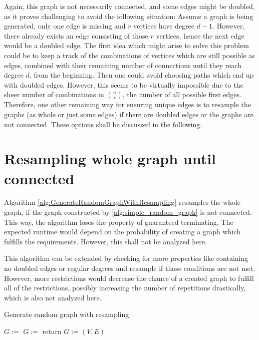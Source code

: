 Again, this graph is not necessarily connected, and some edges might be doubled, as it proves challenging to avoid the following situation: Assume a graph is being generated, only one edge is missing and $r$ vertices have degree $d-1$. However, there already exists an edge consisting of those $r$ vertices, hence the next edge would be a doubled edge. The first idea which might arise to solve this problem could be to keep a track of the combinations of vertices which are still possible as edges, combined with their remaining number of connections until they reach degree $d$, from the beginning. Then one could avoid choosing paths which end up with doubled edges. However, this seems to be virtually impossible due to the sheer number of combinations in $n\choose r$, the number of all possible first edges. Therefore, one other remaining way for ensuring unique edges is to resample the graphs (as whole or just some edges) if there are doubled edges or the graphs are not connected. These options shall be discussed in the following.

\section{Resampling whole graph until connected}
Algorithm \ref{alg:GenerateRandomGraphWithResampling} resamples the whole graph, if the graph constructed by \cref{alg:simple_random_graph} is not connected. This way, the algorithm loses the property of guaranteed terminating. The expected runtime would depend on the probability of creating a graph which fulfills the requirements. However, this shall not be analyzed here. 


This algorithm can be extended by checking for more properties like containing no doubled edges or regular degrees and resample if those conditions are not met. However, more restrictions would decrease the chance of a created graph to fulfill all of the restrictions, possibly increasing the number of repetitions drastically, which is also not analyzed here.



\begin{algorithm}[htpb]
	\caption{Generate random graph with resampling\label{alg:GenerateRandomGraphWithResampling}} 
	\begin{algorithmic}
		\State $G:=$ 
		\State $G:=$ 
		\EndWhile
		\State return $G:=(V,E)$	
		\EndFunction 
	\end{algorithmic}
\end{algorithm}	

